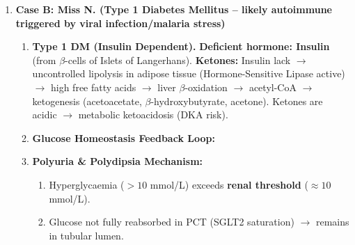 \documentclass[11pt]{article}
\begin{document}
\begin{enumerate}
    \item \textbf{Case B: Miss N. (Type 1 Diabetes Mellitus -- likely autoimmune triggered by viral infection/malaria stress)}
    \begin{enumerate}
        \item \textbf{Type 1 DM (Insulin Dependent).} \textbf{Deficient hormone: Insulin} (from $\beta$-cells of Islets of Langerhans). \textbf{Ketones:} Insulin lack $\rightarrow$ uncontrolled lipolysis in adipose tissue (Hormone-Sensitive Lipase active) $\rightarrow$ high free fatty acids $\rightarrow$ liver $\beta$-oxidation $\rightarrow$ acetyl-CoA $\rightarrow$ ketogenesis (acetoacetate, $\beta$-hydroxybutyrate, acetone). Ketones are acidic $\rightarrow$ metabolic ketoacidosis (DKA risk).
        \item \textbf{Glucose Homeostasis Feedback Loop:}
        \begin{center}
        \end{center}
        \item \textbf{Polyuria \& Polydipsia Mechanism:}
        \begin{enumerate}
            \item Hyperglycaemia ($> 10$ mmol/L) exceeds \textbf{renal threshold} ($\approx 10$ mmol/L).
            \item Glucose not fully reabsorbed in PCT (SGLT2 saturation) $\rightarrow$ remains in tubular lumen.

\end{enumerate}
\end{enumerate}
\end{enumerate}
\end{document}
